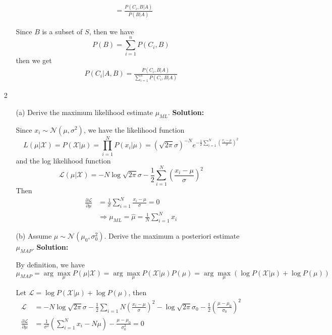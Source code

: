 \documentclass{article}
\begin{document}
\begin{enumerate}
\begin{enumerate}
\begin{align*}
            &=\frac{P(C_i,B|A)}{P(B|A)}
        \end{align*}
        \par Since $B$ is a subset of $S$, then we have
        \[P(B)=\sum_{i=1}^n P(C_i,B)\]
        then we get
        \begin{align*}
            P(C_i|A,B)=\frac{P(C_i,B|A)}{\sum_{i=1}^n P(C_i, B|A)}
        \end{align*}
    \end{enumerate}
    \item[2]
    \begin{enumerate}
    \setlength\parindent{2em}
        \item[(a)]Derive the maximum likelihood estimate $\mu_{ML}$.\newline
        {\bf Solution:}\par
        Since $x_i\sim\mathcal{N}(\mu,\sigma^2)$, we have the likelihood function\[L(\mu|\mathcal{X})=P(\mathcal{X}|\mu)=\prod_{i=1}^N P(x_i|\mu)=\left(\sqrt{2\pi}\sigma\right)^{-N}e^{-\frac{1}{2}\sum_{i=1}^N \left(\frac{x_i-\mu}{\sigma}\right)^2}\]
        and the log likelihood function
        \[\mathcal{L}(\mu|\mathcal{X})=-N\log\sqrt{2\pi}\sigma-\frac{1}{2}\sum_{i=1}^N\left(\frac{x_i-\mu}{\sigma}\right)^2\]
        Then 
        \begin{align*}
            \frac{\partial \mathcal{L}}{\partial \mu} &= \frac{1}{\sigma}\sum_{i=1}^N\frac{x_i-\mu}{\sigma}=0\\
            &\Rightarrow \mu_{ML}=\hat{\mu}=\frac{1}{N}\sum_{i=1}^N x_i
        \end{align*}
        \item[(b)] Assume $\mu\sim \mathcal{N}(\mu_0, \sigma_0^2)$. Derive the maximum a posteriori estimate $\mu_{MAP}$.\newline
        {\bf Solution:}\par
        By definition, we have
        \[\mu_{MAP}=\arg\max\limits_{\mu} P(\mu|\mathcal{X})=\arg\max\limits_{\mu} P(\mathcal{X}|\mu)P(\mu)=\arg\max\limits_{\mu} \left(\log P(\mathcal{X}|\mu)+\log P(\mu)\right)\]
        \par Let $\mathcal{L}=\log P(\mathcal{X}|\mu)+\log P(\mu)$, then 
        \begin{align*}
            \mathcal{L}&=-N\log \sqrt{2\pi}\sigma-\frac{1}{2}\sum_{i=1}N\left(\frac{x_i-\mu}{\sigma}\right)^2-\log \sqrt{2\pi}\sigma_0-\frac{1}{2}\left(\frac{\mu-\mu_0}{\sigma_0}\right)^2\\
            \frac{\partial \mathcal{L}}{\partial \mu} &= \frac{1}{\sigma^2}\left(\sum_{i=1}^N x_i-N\mu\right)-\frac{\mu-\mu_0}{\sigma_0^2}=0\\

\end{align*}
\end{enumerate}
\end{enumerate}
\end{document}
